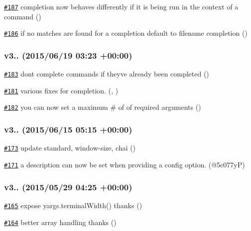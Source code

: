 \begin{DoxyItemize}
\item \href{https://github.com/bcoe/yargs/pull/187}{\tt \#187} completion now behaves differently if it is being run in the context of a command ()
\item \href{https://github.com/bcoe/yargs/pull/186}{\tt \#186} if no matches are found for a completion default to filename completion ()
\end{DoxyItemize}

\subsubsection*{v3.. (2015/06/19 03\+:23 +00\+:00)}


\begin{DoxyItemize}
\item \href{https://github.com/bcoe/yargs/pull/183}{\tt \#183} don\textquotesingle{}t complete commands if they\textquotesingle{}ve already been completed ()
\item \href{https://github.com/bcoe/yargs/pull/181}{\tt \#181} various fixes for completion. (, )
\item \href{https://github.com/bcoe/yargs/pull/182}{\tt \#182} you can now set a maximum \# of of required arguments ()
\end{DoxyItemize}

\subsubsection*{v3.. (2015/06/15 05\+:15 +00\+:00)}


\begin{DoxyItemize}
\item \href{https://github.com/bcoe/yargs/pull/173}{\tt \#173} update standard, window-\/size, chai ()
\item \href{https://github.com/bcoe/yargs/pull/171}{\tt \#171} a description can now be set when providing a config option. (@5c077yP)
\end{DoxyItemize}

\subsubsection*{v3.. (2015/05/29 04\+:25 +00\+:00)}


\begin{DoxyItemize}
\item \href{https://github.com/bcoe/yargs/pull/165}{\tt \#165} expose yargs.\+terminal\+Width() thanks  ()
\item \href{https://github.com/bcoe/yargs/pull/164}{\tt \#164} better array handling thanks  ()
\end{DoxyItemize}

